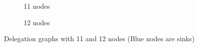 \begin{figure}[h]
    \centering
    \begin{subfigure}[t]{0.45\textwidth}
        \centering
        \caption{11 nodes}
        \label{subfig:random-11and12-11}
    \end{subfigure}
    \hfill
    \begin{subfigure}[t]{0.45\textwidth}
        \centering
        \caption{12 nodes}
    \end{subfigure}
    \caption{Delegation graphs with 11 and 12 nodes (Blue nodes are sinks)}
    \label{fig:random-11and12}
\end{figure}

